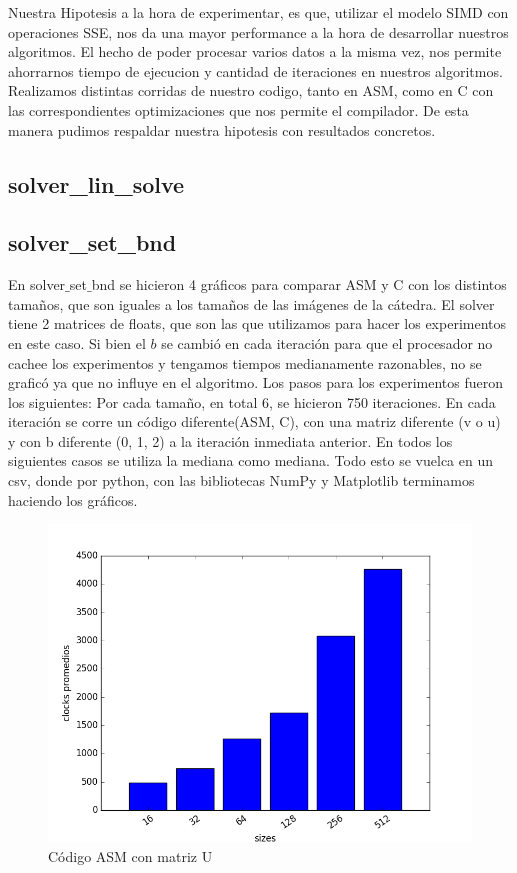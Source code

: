\graphicspath{{./img/}}

Nuestra Hipotesis a la hora de experimentar, es que, utilizar el modelo SIMD con operaciones SSE, nos da una mayor performance a la hora de desarrollar nuestros algoritmos. El hecho de poder procesar varios datos a la misma vez, nos permite ahorrarnos tiempo de ejecucion y cantidad de iteraciones en nuestros algoritmos.
Realizamos distintas corridas de nuestro codigo, tanto en ASM, como en C con las correspondientes optimizaciones que nos permite el compilador. De esta manera pudimos respaldar nuestra hipotesis con resultados concretos.

\subsection{solver\_lin\_solve}

\subsection{solver\_set\_bnd}

En solver$\_$set$\_$bnd se hicieron 4 gráficos para comparar ASM y C con los distintos tamaños, que son iguales a los tamaños de las imágenes de la cátedra. El solver tiene 2 matrices de floats, que son las que utilizamos para hacer los experimentos en este caso. Si bien el $b$ se cambió en cada iteración para que el procesador no cachee los experimentos y tengamos tiempos medianamente razonables, no se graficó ya que no influye en el algoritmo.
Los pasos para los experimentos fueron los siguientes:
Por cada tamaño, en total 6, se hicieron 750 iteraciones. En cada iteración se corre un código diferente(ASM, C), con una matriz diferente (v o u) y con b diferente (0, 1, 2) a la iteración inmediata anterior. En todos los siguientes casos se utiliza la mediana como mediana.
Todo esto se vuelca en un csv, donde por python, con las bibliotecas NumPy y Matplotlib terminamos haciendo los gráficos. 

\begin{figure}[h]
  \centering
  	\includegraphics[width=.6\linewidth]{ClocksASMU.png}
  	\caption{Código ASM con matriz U}
  	\label{fig:ASMU}
\end{figure}

